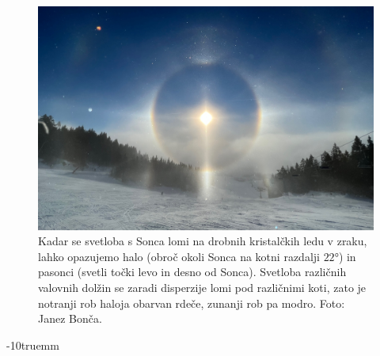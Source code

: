 \begin{figure}[!htp]
\centering
\includegraphics[width=93truemm]{slike/09_halo.jpg}
\caption{Kadar se svetloba s Sonca lomi na drobnih kristalčkih ledu v zraku,
lahko opazujemo halo (obroč okoli Sonca na kotni razdalji $22\si{\degree}$) 
in pasonci (svetli točki levo in desno od Sonca). 
Svetloba različnih valovnih dolžin se zaradi disperzije lomi pod različnimi koti, zato je 
notranji rob haloja obarvan rdeče, zunanji rob pa modro. Foto: Janez Bonča.}
\label{fig:09_halo}
\end{figure}
\vglue-10truemm

